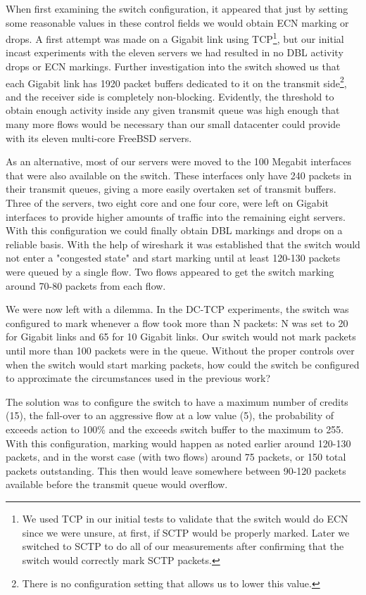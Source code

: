 \documentclass[12pt]{article}
\begin{document}
 When first examining the switch configuration, it appeared that just by setting some reasonable values in these
 control fields we would obtain ECN marking or drops. A first attempt was made on a Gigabit
 link using TCP\footnote{We used TCP in our initial tests to validate that the switch would do ECN since
 we were unsure, at first, if SCTP would be properly marked. Later we switched to SCTP to do all of our measurements
 after confirming that the switch would correctly mark SCTP packets.},
 but our initial incast experiments with the eleven servers we had resulted in no DBL  
 activity drops or ECN markings. Further investigation into the switch showed us that each Gigabit link has 1920 packet
 buffers dedicated to it on the transmit side\footnote{There is no configuration setting that allows us
 to lower this value.}, and the receiver side is completely non-blocking. Evidently, the
 threshold to obtain enough activity inside any given transmit queue was high enough that many more
 flows would be necessary than our small datacenter could provide with its eleven multi-core FreeBSD servers. 
 
 As an alternative, most of our servers were moved to the 100 Megabit interfaces that were also available
 on the switch. These interfaces only have 240 packets in their transmit queues, giving a more easily
 overtaken set of transmit buffers. Three of the servers,
 two eight core and one four core, were left on Gigabit interfaces to provide higher amounts of traffic
 into the remaining eight servers. With this configuration we could finally obtain DBL markings and drops
 on a reliable basis. With the help of wireshark\cite{wireshark} it was established that the switch would not
 enter a "congested state" and start marking until at least 120-130 packets were queued by a single
 flow. Two flows appeared to get the switch marking around 70-80 packets from each flow.
 
We were now left with a dilemma. In the DC-TCP experiments, the switch was configured to mark
 whenever a flow took more than N packets:  N was set to 20 for Gigabit links and 65 for
 10 Gigabit links. Our switch would not mark packets until more than
 100 packets were in the queue. Without the proper controls over when the switch would start marking packets,  how could the switch 
 be configured to approximate the circumstances used in the previous work?
 
 The solution was to configure the switch to have a maximum number
 of credits (15), the fall-over to an aggressive flow at a low value (5), the probability
 of exceeds action to 100\% and the exceeds switch buffer to the maximum to 255. With
 this configuration, marking would happen as noted earlier around 120-130 packets, and
 in the worst case (with two flows) around 75 packets, or 150 total packets outstanding. This then
 would leave somewhere between 90-120 packets available before the transmit queue would overflow.
 
\end{document}
